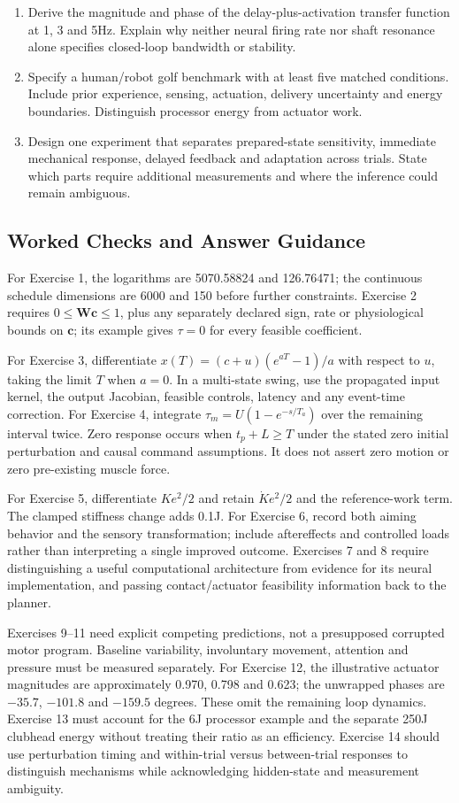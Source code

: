 \begin{enumerate}[leftmargin=*,itemsep=8pt]
\item Derive the magnitude and phase of the delay-plus-activation transfer function at 1, 3 and 5Hz. Explain why neither neural firing rate nor shaft resonance alone specifies closed-loop bandwidth or stability.
\item Specify a human/robot golf benchmark with at least five matched conditions. Include prior experience, sensing, actuation, delivery uncertainty and energy boundaries. Distinguish processor energy from actuator work.
\item Design one experiment that separates prepared-state sensitivity, immediate mechanical response, delayed feedback and adaptation across trials. State which parts require additional measurements and where the inference could remain ambiguous.
\end{enumerate}

\subsection{Worked Checks and Answer Guidance}

For Exercise 1, the logarithms are 5070.58824 and 126.76471; the continuous schedule dimensions are 6000 and 150 before further constraints. Exercise 2 requires $0\leq\bm W\bm c\leq1$, plus any separately declared sign, rate or physiological bounds on $\bm c$; its example gives $\tau=0$ for every feasible coefficient.

For Exercise 3, differentiate $x(T)=(c+u)(e^{aT}-1)/a$ with respect to $u$, taking the limit $T$ when $a=0$. In a multi-state swing, use the propagated input kernel, the output Jacobian, feasible controls, latency and any event-time correction. For Exercise 4, integrate $\tau_m=U(1-e^{-s/T_a})$ over the remaining interval twice. Zero response occurs when $t_p+L\geq T$ under the stated zero initial perturbation and causal command assumptions. It does not assert zero motion or zero pre-existing muscle force.

For Exercise 5, differentiate $Ke^2/2$ and retain $\dot K e^2/2$ and the reference-work term. The clamped stiffness change adds 0.1J. For Exercise 6, record both aiming behavior and the sensory transformation; include aftereffects and controlled loads rather than interpreting a single improved outcome. Exercises 7 and 8 require distinguishing a useful computational architecture from evidence for its neural implementation, and passing contact/actuator feasibility information back to the planner.

Exercises 9--11 need explicit competing predictions, not a presupposed corrupted motor program. Baseline variability, involuntary movement, attention and pressure must be measured separately. For Exercise 12, the illustrative actuator magnitudes are approximately 0.970, 0.798 and 0.623; the unwrapped phases are $-35.7$, $-101.8$ and $-159.5$ degrees. These omit the remaining loop dynamics. Exercise 13 must account for the 6J processor example and the separate 250J clubhead energy without treating their ratio as an efficiency. Exercise 14 should use perturbation timing and within-trial versus between-trial responses to distinguish mechanisms while acknowledging hidden-state and measurement ambiguity.
